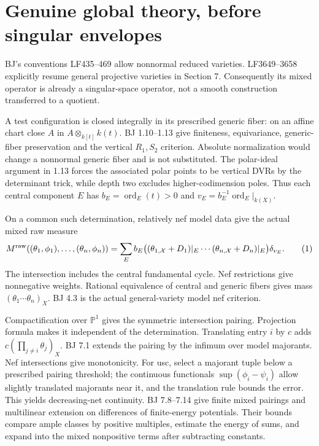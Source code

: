 \documentclass[
  10pt,
]{article}
\begin{document}
\section{Genuine global theory, before singular
envelopes}\label{genuine-global-theory-before-singular-envelopes}

BJ's conventions LF435--469 allow nonnormal reduced varieties.
LF3649--3658 explicitly resume general projective varieties in Section
7. Consequently its mixed operator is already a singular-space operator,
not a smooth construction transferred to a quotient.

A test configuration is closed integrally in its prescribed generic
fiber: on an affine chart close \(A\) in \(A\otimes_{k[t]}k(t)\). BJ
1.10--1.13 give finiteness, equivariance, generic-fiber preservation and
the vertical \(R_1,S_2\) criterion. Absolute normalization would change
a nonnormal generic fiber and is not substituted. The polar-ideal
argument in 1.13 forces the associated polar points to be vertical DVRs
by the determinant trick, while depth two excludes higher-codimension
poles. Thus each central component \(E\) has
\(b_E=\operatorname{ord}_E(t)>0\) and
\(v_E=b_E^{-1}\operatorname{ord}_E|_{k(X)}\).

On a common such determination, relatively nef model data give the
actual mixed raw measure \[
 M^{\rm raw}((\theta_1,\phi_1),\ldots,(\theta_n,\phi_n))
 =\sum_E b_E\bigl((\theta_{1,\mathcal X}+D_1)|_E\cdots
                  (\theta_{n,\mathcal X}+D_n)|_E\bigr)\delta_{v_E}. \tag{1}
\] The intersection includes the central fundamental cycle. Nef
restrictions give nonnegative weights. Rational equivalence of central
and generic fibers gives mass \((\theta_1\cdots\theta_n)_X\). BJ 4.3 is
the actual general-variety model nef criterion.

Compactification over \(\mathbb P^1\) gives the symmetric intersection
pairing. Projection formula makes it independent of the determination.
Translating entry \(i\) by \(c\) adds \(c(\prod_{j\ne i}\theta_j)_X\).
BJ 7.1 extends the pairing by the infimum over model majorants. Nef
intersections give monotonicity. For usc, select a majorant tuple below
a prescribed pairing threshold; the continuous functionals
\(\sup(\phi_i-\psi_i)\) allow slightly translated majorants near it, and
the translation rule bounds the error. This yields decreasing-net
continuity. BJ 7.8--7.14 give finite mixed pairings and multilinear
extension on differences of finite-energy potentials. Their bounds
compare ample classes by positive multiples, estimate the energy of
sums, and expand into the mixed nonpositive terms after subtracting
constants.
\end{document}
